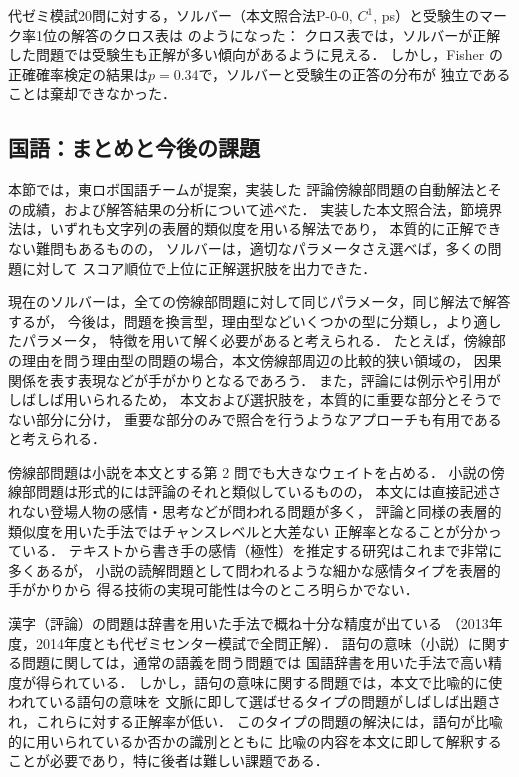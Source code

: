 \documentclass[japanese]{jnlp_1.4b}
\def\TABREF#1{}
\begin{document}
代ゼミ模試20問に対する，ソルバー（本文照合法P-0-0, $C^1$, ps）と受験生のマーク率1位の解答のクロス表は
\TABREF{tab:kokugo:cross}のようになった：
クロス表では，ソルバーが正解した問題では受験生も正解が多い傾向があるように見える．
しかし，Fisher の正確確率検定の結果は$p = 0.34$で，ソルバーと受験生の正答の分布が
独立であることは棄却できなかった．


\subsection{国語：まとめと今後の課題}

本節では，東ロボ国語チームが提案，実装した
評論傍線部問題の自動解法とその成績，および解答結果の分析について述べた．
実装した本文照合法，節境界法は，いずれも文字列の表層的類似度を用いる解法であり，
本質的に正解できない難問もあるものの，
ソルバーは，適切なパラメータさえ選べば，多くの問題に対して
スコア順位で上位に正解選択肢を出力できた．

現在のソルバーは，全ての傍線部問題に対して同じパラメータ，同じ解法で解答するが，
今後は，問題を換言型，理由型などいくつかの型に分類し，より適したパラメータ，
特徴を用いて解く必要があると考えられる．
たとえば，傍線部の理由を問う理由型の問題の場合，本文傍線部周辺の比較的狭い領域の，
因果関係を表す表現などが手がかりとなるであろう．
また，評論には例示や引用がしばしば用いられるため，
本文および選択肢を，本質的に重要な部分とそうでない部分に分け，
重要な部分のみで照合を行うようなアプローチも有用であると考えられる．

傍線部問題は小説を本文とする第 2 問でも大きなウェイトを占める．
小説の傍線部問題は形式的には評論のそれと類似しているものの，
本文には直接記述されない登場人物の感情・思考などが問われる問題が多く，
評論と同様の表層的類似度を用いた手法ではチャンスレベルと大差ない
正解率となることが分かっている\cite{BaseMethod}．
テキストから書き手の感情（極性）を推定する研究はこれまで非常に多くあるが，
小説の読解問題として問われるような細かな感情タイプを表層的手がかりから
得る技術の実現可能性は今のところ明らかでない．

漢字（評論）の問題は辞書を用いた手法で概ね十分な精度が出ている
（2013年度，2014年度とも代ゼミセンター模試で全問正解）．
語句の意味（小説）に関する問題に関しては，通常の語義を問う問題では
国語辞書を用いた手法で高い精度が得られている．
しかし，語句の意味に関する問題では，本文で比喩的に使われている語句の意味を
文脈に即して選ばせるタイプの問題がしばしば出題され，これらに対する正解率が低い．
このタイプの問題の解決には，語句が比喩的に用いられているか否かの識別とともに
比喩の内容を本文に即して解釈することが必要であり，特に後者は難しい課題である．
\end{document}
